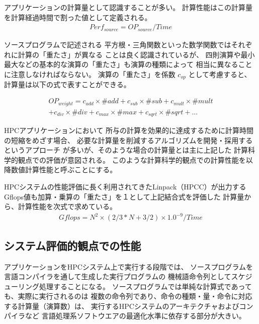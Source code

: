 \documentclass[submit,techrep,noauthor]{ipsj}
\begin{document}
アプリケーションの計算量として認識することが多い。
計算性能はこの計算量を計算経過時間で割った値として定義される。
\begin{align*}
Perf_{source} = OP_{source} / Time	%
\end{align*}

ソースプログラムで記述される
平方根・三角関数といった数学関数ではそれぞれに計算の「重たさ」が異なる
ことは良く認識されているが、
四則演算や最小最大などの基本的な演算の「重たさ」も演算の種類によって
相当に異なることに注意しなければならない。
演算の「重たさ」を係数
\begin{math} c_{op} \end{math}
として考慮すると、計算量は以下の式で表すことができる。

\begin{align*}
OP_{weight} =
	c_{add}\times \#add + c_{sub}\times \#sub + c_{mult}\times \#mult \\
	+ c_{div}\times \#div + c_{max}\times \#max + c_{sqrt}\times \#sqrt + ...
\end{align*}


HPCアプリケーションにおいて
所与の計算を効果的に達成するために計算時間の短縮をめざす場合、
必要な計算量を削減するアルゴリズムを開発・採用するというアプローチ
が多いが、そのような場合の計算量とは主に上記した
計算科学的観点での評価が意図される。
このような計算科学的観点での計算性能を以降数値計算性能と呼ぶことにする。

HPCシステムの性能評価に長く利用されてきたLinpack（HPCC）が出力する
Gflops値も加算・乗算の「重たさ」を１として上記結合式を評価した
計算量から、計算性能を次式で求めている。
\begin{align*}
Gflops = N^{2} \times ( 2/3 * N + 3/2 ) \times 1.0^{-9} / Time 
\end{align*}



\subsection {システム評価的観点での性能}
\label{subsection:system-perf}

アプリケーションをHPCシステム上で実行する段階では、
ソースプログラムを言語コンパイラを通して生成した実行プログラムの
機械語命令列としてスケジューリング処理することになる。
ソースプログラムでは単純な計算式であっても、実際に実行されるのは
複数の命令列であり、命令の種類・量・命令に対応する計算量（演算数）は、
実行するHPCシステムのアーキテクチャおよびコンパイラなど
言語処理系ソフトウエアの最適化水準に依存する部分が大きい。
\end{document}
